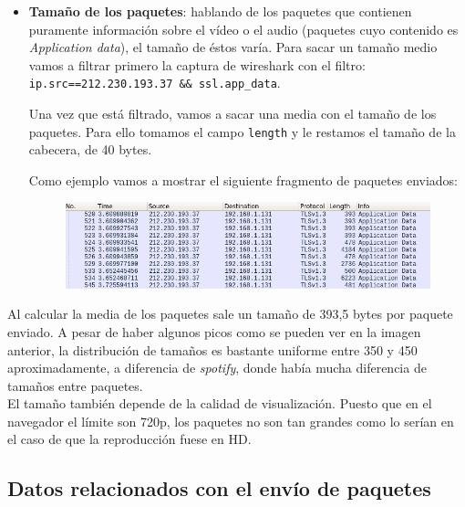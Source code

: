 \documentclass[11pt,a4paper]{article}
\begin{document}
\begin{itemize}
	\item \textbf{Tamaño de los paquetes}: hablando de los paquetes que contienen puramente información sobre el vídeo o el audio (paquetes cuyo contenido es \textit{Application data}), el tamaño de éstos varía. Para sacar un tamaño medio vamos a filtrar primero la captura de wireshark con el filtro: \color{deepgreen}\texttt{ip.src==212.230.193.37 \&\& ssl.app\_data}\color{black}.
	
	Una vez que está filtrado, vamos a sacar una media con el tamaño de los paquetes. Para ello tomamos el campo \texttt{length} y le restamos el tamaño de la cabecera, de 40 bytes.
	
	Como ejemplo vamos a mostrar el siguiente fragmento de paquetes enviados:
	
	\begin{figure}[H]
		\centering
		\includegraphics[scale=0.5]{img/frag-netflix-size.png}
	\end{figure}
\end{itemize}

	Al calcular la media de los paquetes sale un tamaño de 393,5 bytes por paquete enviado. A pesar de haber algunos picos como se pueden ver en la imagen anterior, la distribución de tamaños es bastante uniforme entre 350 y 450 aproximadamente, a diferencia de \textit{spotify}, donde había mucha diferencia de tamaños entre paquetes.\\
	
	El tamaño también depende de la calidad de visualización. Puesto que en el navegador el límite son 720p, los paquetes no son tan grandes como lo serían en el caso de que la reproducción fuese en HD.


\subsection*{Datos relacionados con el envío de paquetes}
\end{document}
